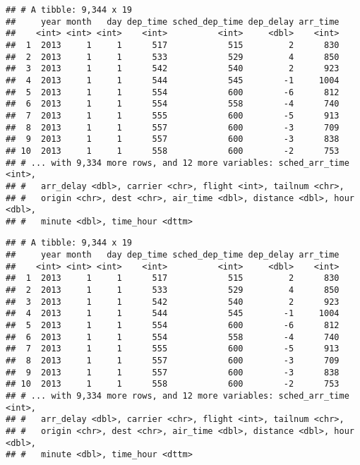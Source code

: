 \documentclass[]{article}
\newenvironment{Shaded}{\begin{snugshade}}{\end{snugshade}}
\newcommand{\KeywordTok}[1]{\textcolor[rgb]{0.13,0.29,0.53}{\textbf{#1}}}
\newcommand{\DecValTok}[1]{\textcolor[rgb]{0.00,0.00,0.81}{#1}}
\newcommand{\CommentTok}[1]{\textcolor[rgb]{0.56,0.35,0.01}{\textit{#1}}}
\newcommand{\NormalTok}[1]{#1}
\begin{document}
\begin{verbatim}
## # A tibble: 9,344 x 19
##     year month   day dep_time sched_dep_time dep_delay arr_time
##    <int> <int> <int>    <int>          <int>     <dbl>    <int>
##  1  2013     1     1      517            515         2      830
##  2  2013     1     1      533            529         4      850
##  3  2013     1     1      542            540         2      923
##  4  2013     1     1      544            545        -1     1004
##  5  2013     1     1      554            600        -6      812
##  6  2013     1     1      554            558        -4      740
##  7  2013     1     1      555            600        -5      913
##  8  2013     1     1      557            600        -3      709
##  9  2013     1     1      557            600        -3      838
## 10  2013     1     1      558            600        -2      753
## # ... with 9,334 more rows, and 12 more variables: sched_arr_time <int>,
## #   arr_delay <dbl>, carrier <chr>, flight <int>, tailnum <chr>,
## #   origin <chr>, dest <chr>, air_time <dbl>, distance <dbl>, hour <dbl>,
## #   minute <dbl>, time_hour <dttm>
\end{verbatim}

\begin{Shaded}
\end{Shaded}

\begin{verbatim}
## # A tibble: 9,344 x 19
##     year month   day dep_time sched_dep_time dep_delay arr_time
##    <int> <int> <int>    <int>          <int>     <dbl>    <int>
##  1  2013     1     1      517            515         2      830
##  2  2013     1     1      533            529         4      850
##  3  2013     1     1      542            540         2      923
##  4  2013     1     1      544            545        -1     1004
##  5  2013     1     1      554            600        -6      812
##  6  2013     1     1      554            558        -4      740
##  7  2013     1     1      555            600        -5      913
##  8  2013     1     1      557            600        -3      709
##  9  2013     1     1      557            600        -3      838
## 10  2013     1     1      558            600        -2      753
## # ... with 9,334 more rows, and 12 more variables: sched_arr_time <int>,
## #   arr_delay <dbl>, carrier <chr>, flight <int>, tailnum <chr>,
## #   origin <chr>, dest <chr>, air_time <dbl>, distance <dbl>, hour <dbl>,
## #   minute <dbl>, time_hour <dttm>
\end{verbatim}
\end{document}
